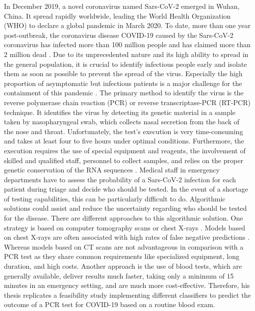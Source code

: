 In December 2019, a novel coronavirus named Sars-CoV-2 emerged in Wuhan, China. 
It spread rapidly worldwide, leading the World Health Organization (WHO) 
to declare a global pandemic in March 2020. To date, more than one year 
post-outbreak, the coronavirus disease COVID-19 caused by the Sars-CoV-2 
coronavirus has infected more than 100 million people and has claimed more than 
2 million dead \cite{RN204}. Due to its unprecedented nature and its high 
ability to spread in the general population, it is crucial to identify 
infectious people early and isolate them as soon as possible to 
prevent the spread of the virus. Especially the high proportion of asymptomatic 
but infectious patients is a major challenge for the containment of this 
pandemic \cite{RN205}. The primary method to identify the virus is the reverse 
polymerase chain reaction (PCR) or reverse transcriptase-PCR (RT-PCR) 
technique. It identifies the virus by detecting its genetic 
material in a sample taken by nasopharyngeal swab, which collects nasal 
secretion from the back of the nose and throat. Unfortunately, the test's 
execution is very time-consuming and takes at least four to five hours under 
optimal conditions. 
Furthermore, the execution requires the use of special equipment and reagents, 
the involvement of skilled and qualified staff, personnel to collect samples, 
and relies on the proper genetic conservation of the RNA sequences 
\cite{RN201, RN202}.
Medical staff in emergency departments have to assess the probability of a 
Sars-CoV-2 infection for each patient during triage and decide 
who should be tested. In the event of a shortage of testing capabilities, this 
can be particularly difficult to do. Algorithmic solutions could assist and 
reduce the uncertainty regarding who should be tested for the 
disease. There are different approaches to this algorithmic solution.
One strategy is based on computer tomography scans or chest X-rays 
\cite{RN200}. Models based on chest X-rays are often associated with high rates 
of false negative predictions \cite{RN200, RN206}. Whereas models based on CT 
scans are not advantageous in comparison with a PCR test as they share common 
requirements like specialized equipment, long duration, and high costs.
Another approach is the use of blood tests, which are generally available, 
deliver results much faster, taking only a minimum of 15 minutes in an 
emergency setting, and are much more cost-effective.
Therefore, his thesis replicates a feasibility study implementing different 
classifiers to predict the outcome of a PCR test for COVID-19 based on a 
routine blood exam.
